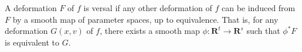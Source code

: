 A deformation $F$ of $f$ is versal if any other deformation of $f$ can be induced from $F$ by a smooth map of parameter spaces, up to equivalence. That is, for any deformation $G(x, v)$ of $f$, there exists a smooth map $\phi: \mathbf{R}^t \to \mathbf{R}^s$ such that $\phi^*F$ is equivalent to $G$.
